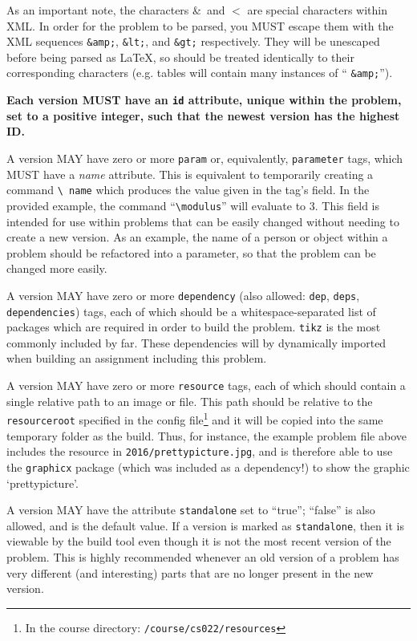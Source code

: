     As an important note, the characters \&\ and $<$ are special 
    characters within XML. In order for the problem to be parsed, you MUST 
    escape them with the XML sequences \texttt{\&amp;}, \texttt{\&lt;}, 
    and \texttt{\&gt;} respectively. They will be unescaped before being 
    parsed as \LaTeX, so should be treated identically to their 
    corresponding characters (e.g. tables will contain many instances of ``
    \texttt{\&amp;}'').
    
    \textbf{Each version MUST have an \texttt{id} attribute, unique within 
    the problem, set to a positive integer, such that the newest version 
    has the highest ID.}
    
    A version MAY have zero or more \texttt{param} or, equivalently, 
    \texttt{parameter} tags, which MUST have a \textit{name} attribute. This is 
    equivalent to temporarily creating a command \texttt{\textbackslash 
    name} which produces the value given in the tag's field. In the 
    provided example, the command ``\texttt{\textbackslash modulus}'' will 
    evaluate to 3. This field is intended for use within problems that can 
    be easily changed without needing to create a new version. As an 
    example, the name of a person or object within a problem should be 
    refactored into a parameter, so that the problem can be changed more easily.
    
    A version MAY have zero or more \texttt{dependency} (also allowed: 
    \texttt{dep}, \texttt{deps}, \texttt{dependencies}) tags, each of 
    which should be a whitespace-separated list of packages which are 
    required in order to build the problem. \texttt{tikz} is the most 
    commonly included by far. These dependencies will by dynamically 
    imported when building an assignment including this problem.
    
    A version MAY have zero or more \texttt{resource} tags, each of which
    should contain a single relative path to an image or file. This path
    should be relative to the \texttt{resourceroot} specified in the config
    file\footnote{In the course directory: \texttt{/course/cs022/resources}}
    and it will be copied into the same temporary folder as the build.
    Thus, for instance, the example problem file above includes the resource
    in \texttt{2016/prettypicture.jpg}, and is therefore able to use
    the \texttt{graphicx} package (which was included as a dependency!) to
    show the graphic `prettypicture'. 
    
    A version MAY have the attribute \texttt{standalone} set to ``true'';
    ``false'' is also allowed, and is the default value. If a version is
    marked as \texttt{standalone}, then it is viewable by the build tool
    even though it is not the most recent version of the problem. This is
    highly recommended whenever an old version of a problem has very different
    (and interesting) parts that are no longer present in the new version.
    
